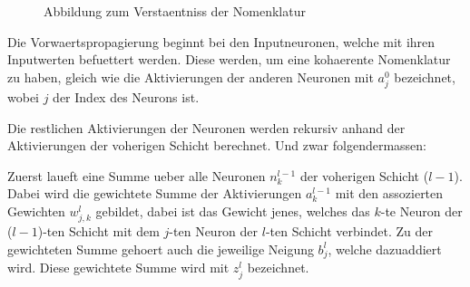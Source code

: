 \documentclass[../main]{subfiles}
\begin{document}
\begin{figure}[h!]
  \centering
  \label{fi:nn_layers}
  \caption{Abbildung zum Verstaentniss der Nomenklatur}
\end{figure}

\par\bigskip
Die Vorwaertspropagierung beginnt bei den Inputneuronen, welche mit ihren
Inputwerten befuettert werden. Diese werden, um eine kohaerente Nomenklatur zu haben,
gleich wie die Aktivierungen der anderen Neuronen mit $a_j^0$ bezeichnet, wobei
$j$ der Index des Neurons ist.\par
Die restlichen Aktivierungen der Neuronen werden rekursiv anhand der
Aktivierungen der voherigen Schicht berechnet. Und zwar folgendermassen:\par
Zuerst laueft eine Summe ueber alle Neuronen $n_k^{l-1}$ der voherigen Schicht
($l-1$). Dabei wird die gewichtete Summe der Aktivierungen $a_k^{l-1}$ mit den
assozierten Gewichten $w_{j,k}^l$ gebildet, dabei ist das Gewicht jenes, welches das
$k$-te Neuron der ($l-1$)-ten Schicht mit dem $j$-ten Neuron der $l$-ten Schicht verbindet.
Zu der gewichteten Summe gehoert auch die jeweilige Neigung $b_j^l$, welche
dazuaddiert wird. Diese gewichtete Summe wird mit $z_j^l$ bezeichnet.
\end{document}
